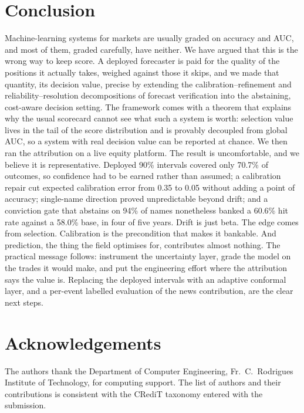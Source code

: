 \documentclass[10pt, a4paper, oneside]{article}
\theoremstyle{definition}
\theoremstyle{plain}
\begin{document}
\section{Conclusion}
\label{sec:conclusion}
Machine-learning systems for markets are usually graded on accuracy and AUC, and most
of them, graded carefully, have neither. We have argued that this is the wrong way to
keep score. A deployed forecaster is paid for the quality of the positions it actually
takes, weighed against those it skips, and we made that quantity, its decision value,
precise by extending the calibration--refinement and reliability--resolution
decompositions of forecast verification into the abstaining, cost-aware decision
setting. The framework comes with a theorem that explains why the usual scorecard
cannot see what such a system is worth: selection value lives in the tail of the score
distribution and is provably decoupled from global AUC, so a system with real decision
value can be reported at chance. We then ran the attribution on a live equity platform.
The result is uncomfortable, and we believe it is representative. Deployed 90\%
intervals covered only 70.7\% of outcomes, so confidence had to be earned rather than
assumed; a calibration repair cut expected calibration error from 0.35 to 0.05 without
adding a point of accuracy; single-name direction proved unpredictable beyond drift;
and a conviction gate that abstains on 94\% of names nonetheless banked a 60.6\% hit
rate against a 58.0\% base, in four of five years. Drift is just beta. The edge comes
from selection. Calibration is the precondition that makes it bankable. And
prediction, the thing the field optimises for, contributes almost nothing. The
practical message follows: instrument the uncertainty layer, grade the model on the
trades it would make, and put the engineering effort where the attribution says the
value is. Replacing the deployed intervals with an adaptive conformal layer, and a
per-event labelled evaluation of the news contribution, are the clear next steps.

\section*{Acknowledgements}
The authors thank the Department of Computer Engineering, Fr.\ C.\ Rodrigues Institute
of Technology, for computing support. The list of authors and their contributions is
consistent with the CRediT taxonomy entered with the submission.
\end{document}
